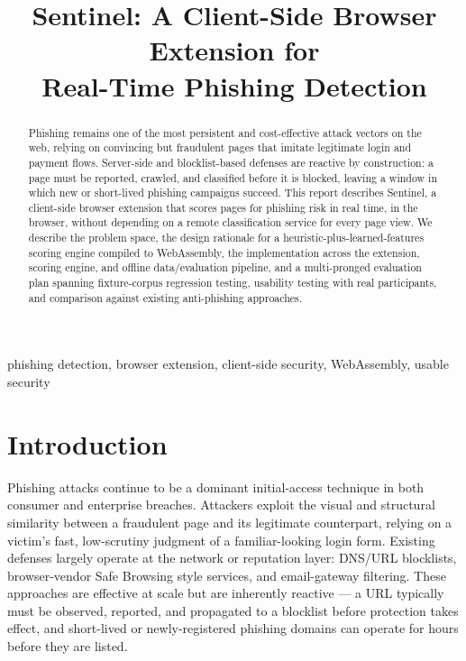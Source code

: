 \documentclass[conference]{IEEEtran}
\begin{document}
\title{Sentinel: A Client-Side Browser Extension for\\Real-Time Phishing Detection}

\author{
}

\maketitle

\begin{abstract}
Phishing remains one of the most persistent and cost-effective attack vectors on the web, relying on convincing but fraudulent pages that imitate legitimate login and payment flows. Server-side and blocklist-based defenses are reactive by construction: a page must be reported, crawled, and classified before it is blocked, leaving a window in which new or short-lived phishing campaigns succeed. This report describes Sentinel, a client-side browser extension that scores pages for phishing risk in real time, in the browser, without depending on a remote classification service for every page view. We describe the problem space, the design rationale for a heuristic-plus-learned-features scoring engine compiled to WebAssembly, the implementation across the extension, scoring engine, and offline data/evaluation pipeline, and a multi-pronged evaluation plan spanning fixture-corpus regression testing, usability testing with real participants, and comparison against existing anti-phishing approaches.
\end{abstract}

\begin{IEEEkeywords}
phishing detection, browser extension, client-side security, WebAssembly, usable security
\end{IEEEkeywords}

\section{Introduction}
Phishing attacks continue to be a dominant initial-access technique in both consumer and enterprise breaches. Attackers exploit the visual and structural similarity between a fraudulent page and its legitimate counterpart, relying on a victim's fast, low-scrutiny judgment of a familiar-looking login form. Existing defenses largely operate at the network or reputation layer: DNS/URL blocklists, browser-vendor Safe Browsing style services, and email-gateway filtering. These approaches are effective at scale but are inherently reactive --- a URL typically must be observed, reported, and propagated to a blocklist before protection takes effect, and short-lived or newly-registered phishing domains can operate for hours before they are listed.
\end{document}
